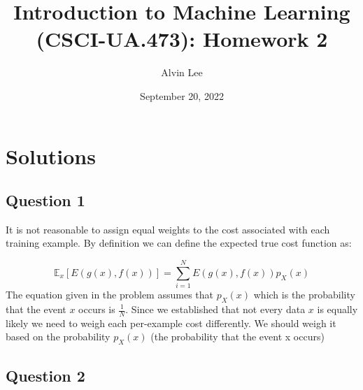 \documentclass{article}
\title{Introduction to Machine Learning
(CSCI-UA.473): Homework 2}
\author{Alvin Lee}
\date{September 20, 2022}
\begin{document}
\maketitle

\section*{Solutions}
\subsection*{Question 1}

It is not reasonable to assign equal weights to the cost associated with each training example.
By definition we can define the expected true cost function as:

\begin{equation}
  \mathbb{E}_x[E(g(x),f(x))] = \sum_{i=1}^NE(g(x),f(x))p_X(x)
\end{equation}
The equation given in the problem assumes that $p_X(x)$ which is the probability that the 
event $x$ occurs is $\frac{1}{N}$. Since we established that not every data $x$ is equally likely
we need to weigh each per-example cost differently. We should weigh it based on the probability
$p_X(x)$ (the probability that the event x occurs)

\subsection*{Question 2}
\end{document}
